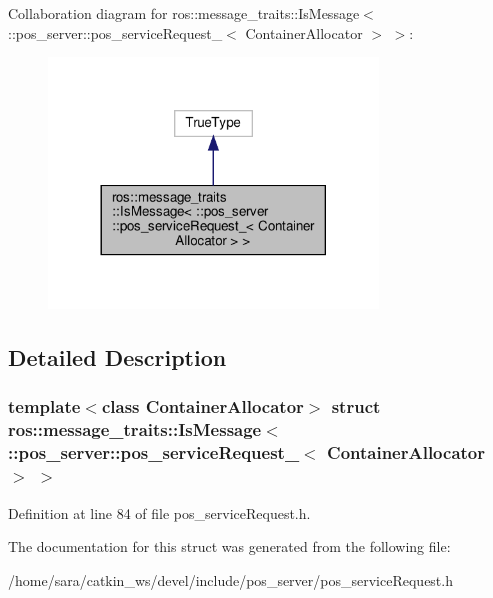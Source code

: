 Collaboration diagram for ros\+:\+:message\+\_\+traits\+:\+:Is\+Message$<$ \+:\+:pos\+\_\+server\+:\+:pos\+\_\+service\+Request\+\_\+$<$ Container\+Allocator $>$ $>$\+:
\nopagebreak
\begin{figure}[H]
\begin{center}
\leavevmode
\includegraphics[width=248pt]{structros_1_1message__traits_1_1IsMessage_3_01_1_1pos__server_1_1pos__serviceRequest___3_01Conta9964ec34541835a782654943d23bc321}
\end{center}
\end{figure}


\subsection{Detailed Description}
\subsubsection*{template$<$class Container\+Allocator$>$\newline
struct ros\+::message\+\_\+traits\+::\+Is\+Message$<$ \+::pos\+\_\+server\+::pos\+\_\+service\+Request\+\_\+$<$ Container\+Allocator $>$ $>$}



Definition at line 84 of file pos\+\_\+service\+Request.\+h.



The documentation for this struct was generated from the following file\+:\begin{DoxyCompactItemize}
\item 
/home/sara/catkin\+\_\+ws/devel/include/pos\+\_\+server/pos\+\_\+service\+Request.\+h\end{DoxyCompactItemize}
